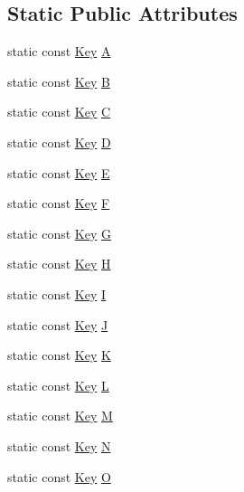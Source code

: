 \subsection*{Static Public Attributes}
\begin{DoxyCompactItemize}
\item 
static const \hyperlink{classastu_1_1Key}{Key} \hyperlink{classastu_1_1Keys_a1b8f7886f9aa0118a92ef52a9e8407e8}{A}
\item 
static const \hyperlink{classastu_1_1Key}{Key} \hyperlink{classastu_1_1Keys_a5df053ae26815cea5e9207eeee2a3ae8}{B}
\item 
static const \hyperlink{classastu_1_1Key}{Key} \hyperlink{classastu_1_1Keys_a9000350684fb93a0947042fdd43c0387}{C}
\item 
static const \hyperlink{classastu_1_1Key}{Key} \hyperlink{classastu_1_1Keys_aa1444c1afe3950d2330f5e555c526035}{D}
\item 
static const \hyperlink{classastu_1_1Key}{Key} \hyperlink{classastu_1_1Keys_adba606dd326617092566c38c0ce0f569}{E}
\item 
static const \hyperlink{classastu_1_1Key}{Key} \hyperlink{classastu_1_1Keys_a1c26bd8c779905493c5f85629adc617d}{F}
\item 
static const \hyperlink{classastu_1_1Key}{Key} \hyperlink{classastu_1_1Keys_a7bf3437c6d5313f889b756ac27c04997}{G}
\item 
static const \hyperlink{classastu_1_1Key}{Key} \hyperlink{classastu_1_1Keys_a2afb77c6bc7655c7b24b9361d45c05b6}{H}
\item 
static const \hyperlink{classastu_1_1Key}{Key} \hyperlink{classastu_1_1Keys_a9ec5b5c983df945dade3e39696bbf7f7}{I}
\item 
static const \hyperlink{classastu_1_1Key}{Key} \hyperlink{classastu_1_1Keys_a8c57ce6e63ff165af041469f7bc009ef}{J}
\item 
static const \hyperlink{classastu_1_1Key}{Key} \hyperlink{classastu_1_1Keys_a61fd0a37308b77b8364833c87fbedde4}{K}
\item 
static const \hyperlink{classastu_1_1Key}{Key} \hyperlink{classastu_1_1Keys_adad52cf3367a5f11f1a052f3284ee8ce}{L}
\item 
static const \hyperlink{classastu_1_1Key}{Key} \hyperlink{classastu_1_1Keys_acf1bf5918098583302ad1ef7d797f9db}{M}
\item 
static const \hyperlink{classastu_1_1Key}{Key} \hyperlink{classastu_1_1Keys_aeba00da189efe9cc66d5b6dc0f7686a5}{N}
\item 
static const \hyperlink{classastu_1_1Key}{Key} \hyperlink{classastu_1_1Keys_ac0d498b26cae6a78b5fe27784800d5c1}{O}

\end{DoxyCompactItemize}
